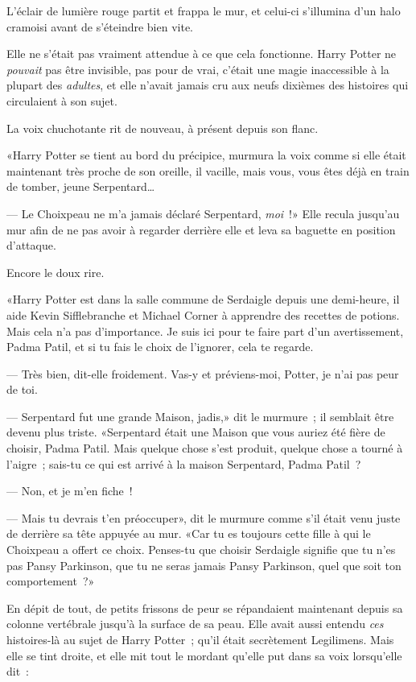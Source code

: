 L'éclair de lumière rouge partit et frappa le mur, et celui-ci s'illumina d'un halo cramoisi avant de s'éteindre bien vite.

Elle ne s'était pas vraiment attendue à ce que cela fonctionne. Harry Potter ne \emph{pouvait} pas être invisible, pas pour de vrai, c'était une magie inaccessible à la plupart des \emph{adultes}, et elle n'avait jamais cru aux neufs dixièmes des histoires qui circulaient à son sujet.

La voix chuchotante rit de nouveau, à présent depuis son flanc.

«Harry Potter se tient au bord du précipice, murmura la voix comme si elle était maintenant très proche de son oreille, il vacille, mais vous, vous êtes déjà en train de tomber, jeune Serpentard…

--- Le Choixpeau ne m'a jamais déclaré Serpentard, \emph{moi}~!» Elle recula jusqu'au mur afin de ne pas avoir à regarder derrière elle et leva sa baguette en position d'attaque.

Encore le doux rire.

«Harry Potter est dans la salle commune de Serdaigle depuis une demi-heure, il aide Kevin Sifflebranche et Michael Corner à apprendre des recettes de potions. Mais cela n'a pas d'importance. Je suis ici pour te faire part d'un avertissement, Padma Patil, et si tu fais le choix de l'ignorer, cela te regarde.

--- Très bien, dit-elle froidement. Vas-y et préviens-moi, Potter, je n'ai pas peur de toi.

--- Serpentard fut une grande Maison, jadis,» dit le murmure~; il semblait être devenu plus triste. «Serpentard était une Maison que vous auriez été fière de choisir, Padma Patil. Mais quelque chose s'est produit, quelque chose a tourné à l'aigre~; sais-tu ce qui est arrivé à la maison Serpentard, Padma Patil~?

--- Non, et je m'en fiche~!

--- Mais tu devrais t'en préoccuper», dit le murmure comme s'il était venu juste de derrière sa tête appuyée au mur. «Car tu es toujours cette fille à qui le Choixpeau a offert ce choix. Penses-tu que choisir Serdaigle signifie que tu n'es pas Pansy Parkinson, que tu ne seras jamais Pansy Parkinson, quel que soit ton comportement~?»

En dépit de tout, de petits frissons de peur se répandaient maintenant depuis sa colonne vertébrale jusqu'à la surface de sa peau. Elle avait aussi entendu \emph{ces} histoires-là au sujet de Harry Potter~; qu'il était secrètement Legilimens. Mais elle se tint droite, et elle mit tout le mordant qu'elle put dans sa voix lorsqu'elle dit~:

